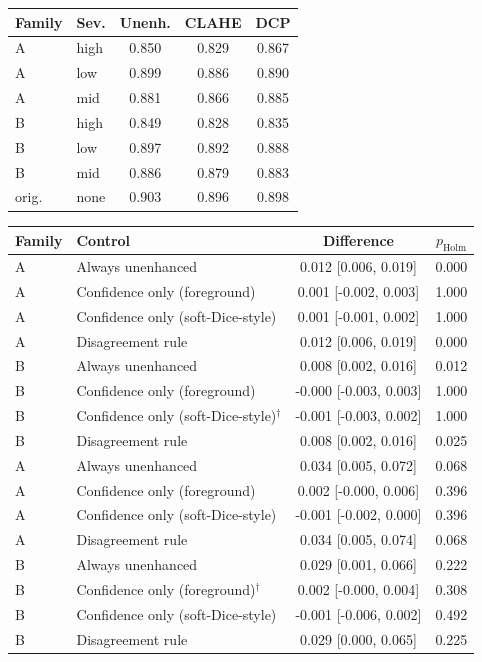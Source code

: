 \documentclass{midl}
\begin{document}
\begin{table}[htbp]
{\scriptsize\begin{tabular}{llccc}\toprule Family & Sev. & Unenh. & CLAHE & DCP\\\midrule
A & high & 0.850 & 0.829 & 0.867 \\
A & low & 0.899 & 0.886 & 0.890 \\
A & mid & 0.881 & 0.866 & 0.885 \\
B & high & 0.849 & 0.828 & 0.835 \\
B & low & 0.897 & 0.892 & 0.888 \\
B & mid & 0.886 & 0.879 & 0.883 \\
orig. & none & 0.903 & 0.896 & 0.898 \\
\bottomrule\end{tabular}}
\end{table}
\begin{table}[htbp]
{\scriptsize\begin{tabular}{llcc}\toprule Family & Control & Difference & $p_{\mathrm{Holm}}$\\\midrule
A & Always unenhanced & 0.012 [0.006, 0.019] & 0.000 \\
A & Confidence only (foreground) & 0.001 [-0.002, 0.003] & 1.000 \\
A & Confidence only (soft-Dice-style) & 0.001 [-0.001, 0.002] & 1.000 \\
A & Disagreement rule & 0.012 [0.006, 0.019] & 0.000 \\
B & Always unenhanced & 0.008 [0.002, 0.016] & 0.012 \\
B & Confidence only (foreground) & -0.000 [-0.003, 0.003] & 1.000 \\
B & Confidence only (soft-Dice-style)$^{\dagger}$ & -0.001 [-0.003, 0.002] & 1.000 \\
B & Disagreement rule & 0.008 [0.002, 0.016] & 0.025 \\
\midrule
A & Always unenhanced & 0.034 [0.005, 0.072] & 0.068 \\
A & Confidence only (foreground) & 0.002 [-0.000, 0.006] & 0.396 \\
A & Confidence only (soft-Dice-style) & -0.001 [-0.002, 0.000] & 0.396 \\
A & Disagreement rule & 0.034 [0.005, 0.074] & 0.068 \\
B & Always unenhanced & 0.029 [0.001, 0.066] & 0.222 \\
B & Confidence only (foreground)$^{\dagger}$ & 0.002 [-0.000, 0.004] & 0.308 \\
B & Confidence only (soft-Dice-style) & -0.001 [-0.006, 0.002] & 0.492 \\
B & Disagreement rule & 0.029 [0.000, 0.065] & 0.225 \\
\bottomrule\end{tabular}}
\end{table}
\end{document}
